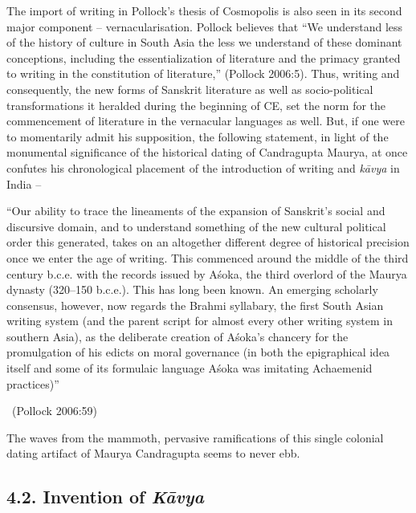 The import of writing in Pollock’s thesis of Cosmopolis is also seen in its second major component – vernacularisation. Pollock believes that “We understand less of the history of culture in South Asia the less we understand of these dominant conceptions, including the essentialization of literature and the primacy granted to writing in the constitution of literature,” (Pollock 2006:5). Thus, writing and consequently, the new forms of Sanskrit literature as well as socio-political transformations it heralded during the beginning of CE, set the norm for the commencement of literature in the vernacular languages as well. But, if one were to momentarily admit his supposition, the following statement, in light of the monumental significance of the historical dating of Candragupta Maurya, at once confutes his chronological placement of the introduction of writing and \textit{kāvya} in India –

\begin{myquote}
“Our ability to trace the lineaments of the expansion of Sanskrit’s social and discursive domain, and to understand something of the new cultural political order this generated, takes on an altogether different degree of historical precision once we enter the age of writing. This commenced around the middle of the third century b.c.e. with the records issued by Aśoka, the third overlord of the Maurya dynasty (320–150 b.c.e.). This has long been known. An emerging scholarly consensus, however, now regards the Brahmi syllabary, the first South Asian writing system (and the parent script for almost every other writing system in southern Asia), as the deliberate creation of Aśoka’s chancery for the promulgation of his edicts on moral governance (in both the epigraphical idea itself and some of its formulaic language Aśoka was imitating Achaemenid practices)” 

~\hfill (Pollock 2006:59)
\end{myquote}

The waves from the mammoth, pervasive ramifications of this single colonial dating artifact of Maurya Candragupta seems to never ebb.



\subsection*{4.2. Invention of \textit{Kāvya}}

